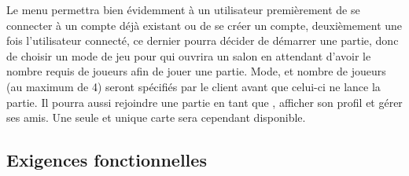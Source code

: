 \documentclass[10pt,a4paper]{article}
\begin{document}
 Le menu permettra bien évidemment à un \gls{utilisateur} premièrement de se connecter à un \gls{compte} déjà existant ou de se créer un \gls{compte}, deuxièmement une fois l'\gls{utilisateur} connecté, ce dernier pourra décider de démarrer une partie, donc de choisir un mode de jeu pour qui ouvrira un salon en attendant d'avoir le nombre requis de \glspl{joueur} afin de jouer une partie. Mode, et nombre de \glspl{joueur} (au maximum de 4) seront spécifiés par le \gls{client} avant que celui-ci ne lance la partie. Il pourra aussi rejoindre une partie en tant que , afficher son profil et gérer ses amis. Une seule et unique carte sera cependant disponible.
\subsection{Exigences fonctionnelles}
\end{document}
